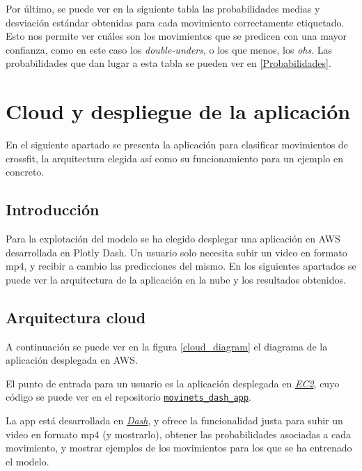 Por último, se puede ver en la siguiente tabla las probabilidades medias y desviación estándar obtenidas para cada movimiento correctamente etiquetado. Esto nos permite ver cuáles son los movimientos que se predicen con una mayor confianza, como en este caso los \textit{double-unders}, o los que menos, los \textit{ohs}. Las probabilidades que dan lugar a esta tabla se pueden ver en \ref{Probabilidades}.




\section{Cloud y despliegue de la aplicación}

En el siguiente apartado se presenta la aplicación para clasificar movimientos de crossfit, la arquitectura elegida así como su funcionamiento para un ejemplo en concreto.

\subsection{Introducción}

Para la explotación del modelo se ha elegido desplegar una aplicación en AWS desarrollada en Plotly Dash. Un usuario solo necesita subir un video en formato mp4, y recibir a cambio las predicciones del mismo. En los siguientes apartados se puede ver la arquitectura de la aplicación en la nube y los resultados obtenidos.

\subsection{Arquitectura cloud}

A continuación se puede ver en la figura \ref{cloud_diagram} el diagrama de la aplicación desplegada en AWS.

El punto de entrada para un usuario es la aplicación desplegada en \href{https://aws.amazon.com/es/ec2/}{\textit{EC2}}, cuyo código se puede ver en el repositorio \href{https://github.com/plaguss/movinets_dash_app}{\texttt{movinets\_dash\_app}}.

La app está desarrollada en \href{https://plotly.com/dash/}{\textit{Dash}}, y ofrece la funcionalidad justa para subir un video en formato mp4 (y mostrarlo), obtener las probabilidades asociadas a cada movimiento, y mostrar ejemplos de los movimientos para los que se ha entrenado el modelo.

